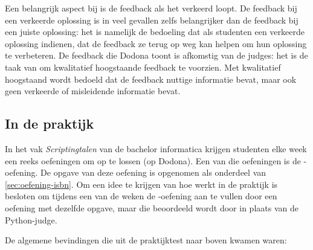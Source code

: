 Een belangrijk aspect bij  is de feedback als het verkeerd loopt.
De feedback bij een verkeerde oplossing is in veel gevallen zelfs belangrijker dan de feedback bij een juiste oplossing: het is namelijk de bedoeling dat als studenten een verkeerde oplossing indienen, dat de feedback ze terug op weg kan helpen om hun oplossing te verbeteren.
De feedback die Dodona toont is afkomstig van de judges: het is de taak van \tested{} om kwalitatief hoogstaande feedback te voorzien.
Met kwalitatief hoogstaand wordt bedoeld dat de feedback nuttige informatie bevat, maar ook geen verkeerde of misleidende informatie bevat.

\subsection{In de praktijk}\label{subsec:in-de-praktijk}

In het vak \emph{Scriptingtalen} van de bachelor informatica krijgen studenten elke week een reeks oefeningen om op te lossen (op Dodona).
Een van die oefeningen is de \emph{}-oefening.
De opgave van deze oefening is opgenomen als onderdeel van \cref{sec:oefening-isbn}.
Om een idee te krijgen van hoe \tested{} werkt in de praktijk is besloten om tijdens een van de weken de \emph{}-oefening aan te vullen door een oefening met dezelfde opgave, maar die beoordeeld wordt door \tested{} in plaats van de Python-judge.

De algemene bevindingen die uit de praktijktest naar boven kwamen waren:


